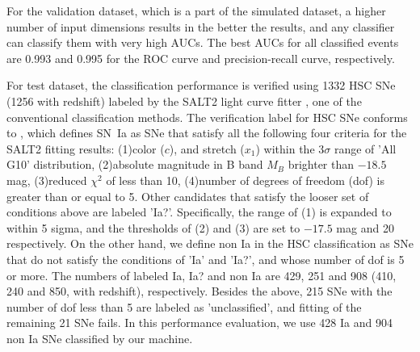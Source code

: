 \documentclass[proof]{pasj01}
\begin{document}
For the validation dataset, which is a part of the simulated dataset, a higher number of input dimensions results in the better the results, and any classifier can classify them with very high AUCs.
The best AUCs for all classified events are 0.993 and 0.995 for the ROC curve and precision-recall curve, respectively.

For test dataset, the classification performance is verified using 1332 HSC SNe (1256 with redshift) labeled by the SALT2 light curve fitter \citep{guy2007,guy10b}, one of the conventional classification methods.
The verification label for HSC SNe conforms to \citet{yasuda19a}, which defines SN~Ia as SNe that satisfy all the following four criteria for the SALT2 fitting results:
(1)color ($c$), and stretch ($x_1$) within the $3\sigma$ range of \citet{scolnickessler2016} 'All G10' distribution, 
(2)absolute magnitude in B band $M_B$ brighter than $-18.5$ mag, 
(3)reduced $\chi ^{2}$ of less than 10,
(4)number of degrees of freedom (dof) is greater than or equal to 5.
Other candidates that satisfy the looser set of conditions above are labeled 'Ia?'.
Specifically, the range of (1) is expanded to within 5 sigma, and the thresholds of (2) and (3) are set to $-17.5$ mag and 20 respectively.
On the other hand, we define non Ia in the HSC classification as SNe that do not satisfy the conditions of 'Ia' and 'Ia?', and whose number of dof is 5 or more.
The numbers of labeled Ia, Ia? and non Ia are 429, 251 and 908 (410, 240 and 850, with redshift), respectively.
Besides the above, 215 SNe with the number of dof less than 5 are labeled as 'unclassified', and fitting of the remaining 21 SNe fails.
In this performance evaluation, we use 428 Ia and 904 non Ia SNe classified by our machine.
\end{document}
